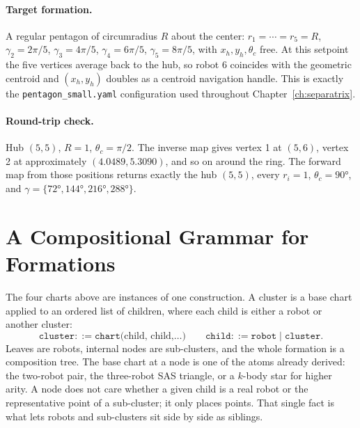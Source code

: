 \documentclass[12pt, letterpaper, oneside]{report}
\begin{document}
\paragraph{Target formation.} A regular pentagon of circumradius $R$ about
the center: $r_1=\cdots=r_5=R$, $\gamma_2=2\pi/5$, $\gamma_3=4\pi/5$,
$\gamma_4=6\pi/5$, $\gamma_5=8\pi/5$, with $x_h,y_h,\theta_c$ free. At this
setpoint the five vertices average back to the hub, so robot 6 coincides
with the geometric centroid and $(x_h,y_h)$ doubles as a centroid navigation
handle. This is exactly the \texttt{pentagon\_small.yaml} configuration used
throughout Chapter~\ref{ch:separatrix}.

\paragraph{Round-trip check.} Hub $(5,5)$, $R=1$, $\theta_c=\pi/2$. The
inverse map gives vertex 1 at $(5,6)$, vertex 2 at approximately
$(4.0489,5.3090)$, and so on around the ring. The forward map from those
positions returns exactly the hub $(5,5)$, every $r_i=1$, $\theta_c=90°$,
and $\gamma=\{72°,144°,216°,288°\}$.

\section{A Compositional Grammar for Formations}
\label{sec:grammar}

The four charts above are instances of one construction. A cluster is a
base chart applied to an ordered list of children, where each child is
either a robot or another cluster:
\begin{equation}
\texttt{cluster} ::= \texttt{chart(} \text{child, child,} \ldots \texttt{)}
\qquad \texttt{child} ::= \texttt{robot} \mid \texttt{cluster}.
\end{equation}
Leaves are robots, internal nodes are sub-clusters, and the whole formation
is a composition tree. The base chart at a node is one of the atoms already
derived: the two-robot pair, the three-robot SAS triangle, or a $k$-body
star for higher arity. A node does not care whether a given child is a real
robot or the representative point of a sub-cluster; it only places points.
That single fact is what lets robots and sub-clusters sit side by side as
siblings.
\end{document}
